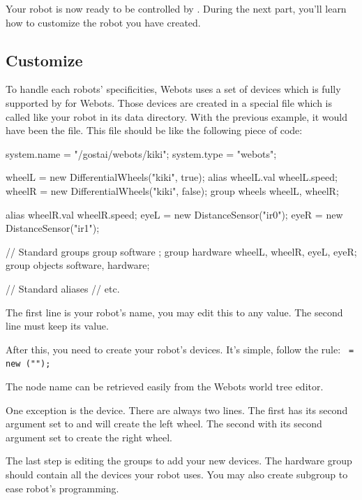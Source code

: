 Your robot is now ready to be controlled by \urbi. During the next
part, you'll learn how to customize the robot you have created.


\subsection{Customize}
\label{webots.own.customize}%

To handle each robots' specificities, Webots uses a set of devices
which is fully supported by \urbi for Webots. Those devices are
created in a special file which is called like your robot in its data
directory.  With the previous example, it would have been the
 file. This file should be like the following
piece of code:

\begin{urbifixme}
system.name = "/gostai/webots/kiki";
system.type = "webots";


wheelL = new DifferentialWheels("kiki", true);
alias wheelL.val wheelL.speed;
wheelR = new DifferentialWheels("kiki", false);
group wheels {wheelL, wheelR};

alias wheelR.val wheelR.speed;
eyeL = new DistanceSensor("ir0");
eyeR = new DistanceSensor("ir1");

// Standard groups
group software {};
group hardware {wheelL, wheelR, eyeL, eyeR};
group objects {software, hardware};

// Standard aliases
// etc.
\end{urbifixme}

The first line is your robot's name, you may edit this to any value.
The second line must keep its value.

After this, you need to create your robot's devices. It's simple,
follow the rule: \texttt{ = new
  (""); }

The node name can be retrieved easily from the Webots world tree
editor.

One exception is the  device.  There are
always two lines. The first has its second argument set to 
and will create the left wheel. The second with its second argument
set to  create the right wheel.

The last step is editing the groups to add your new devices. The
hardware group should contain all the devices your robot uses. You may
also create subgroup to ease robot's programming.


